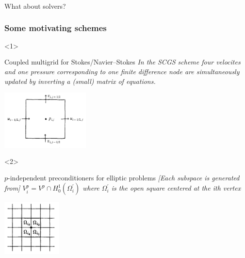 \documentclass[presentation,aspectratio=43, 10pt]{beamer}
\begin{document}
\begin{frame}[standout]
  What about solvers?
\end{frame}


\begin{frame}[t]
  \frametitle{Some motivating schemes}
  \begin{onlyenv}<1>
    \begin{block}{Coupled multigrid for Stokes/Navier--Stokes}
      \emph{In the SCGS scheme four velocites and one pressure
      corresponding to one finite difference node are simultaneously
      updated by inverting a (small) matrix of equations.}

      \begin{center}
        \includegraphics[height=3cm]{vanka}
      \end{center}
      {\hfill \textcite{Vanka:1986}}
    \end{block}
  \end{onlyenv}
  \begin{onlyenv}<2>
    \begin{block}{$p$-independent preconditioners for elliptic problems}
      \emph{[Each subspace is generated from]
      $V_i^p = V^p \cap H^1_0(\Omega_i^{'})$ where $\Omega_i^{'}$ is the open square
      centered at the ith vertex}
      \begin{center}
        \includegraphics[width=3cm]{pavarino}
      \end{center}
      {\hfill \textcite{Pavarino:1993}}
    \end{block}
  \end{onlyenv}


\end{frame}
\end{document}
